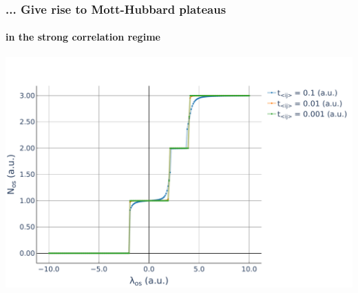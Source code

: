 \documentclass[aspectratio=169]{beamer}
\begin{document}
\begin{frame}
  \frametitle{... Give rise to Mott-Hubbard plateaus}
  \framesubtitle{in the strong correlation regime}
  \begin{center}
    \includegraphics[scale=0.3]{../img/BH-3in3-NvsMu.pdf}
  \end{center}
\end{frame}
\end{document}
